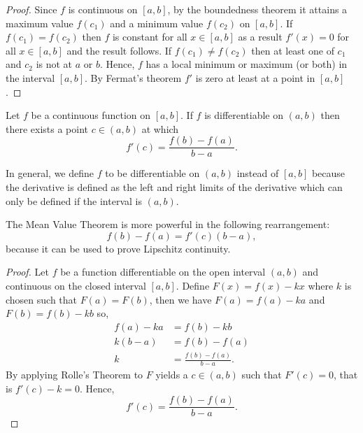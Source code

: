 \documentclass[12pt, a4paper]{article}
\begin{document}
\begin{proof}
    Since \(f\) is continuous on \([a,b]\), by the boundedness theorem it attains a maximum value \(f(c_1)\) and a minimum value \(f(c_2)\) on \([a,b]\). If \(f(c_1)=f(c_2)\) then \(f\) is constant for all \(x\in [a,b]\) as a result \(f'(x)=0\) for all \(x \in [a,b]\) and the result follows. If \(f(c_1) \neq f(c_2)\) then at least one of \(c_1\) and \(c_2\) is not at \(a\) or \(b\). Hence, \(f\) has a local minimum or maximum (or both) in the interval \([a,b]\). By Fermat's theorem \(f'\) is zero at least at a point in \([a,b]\).
\end{proof}

\begin{mdthm}
    Let \(f\) be a continuous function on \([a,b]\). If \(f\) is differentiable on \((a,b)\) then there exists a point \(c\in (a,b)\) at which 
    \[f'(c) = \frac{f(b)-f(a)}{b-a}.\]
\end{mdthm}

\begin{mdnote}
    In general, we define \(f\) to be differentiable on \((a,b)\) instead of \([a,b]\) because the derivative is defined as the left and right limits of the derivative which can only be defined if the interval is \((a,b)\).
\end{mdnote}

\begin{mdnote}
    The Mean Value Theorem is more powerful in the following rearrangement:
    \[f(b)-f(a)=f'(c)(b-a),\]
    because it can be used to prove Lipschitz continuity.
\end{mdnote}

\begin{proof}
    Let \(f\) be a function differentiable on the open interval \((a, b)\) and continuous on the closed interval \([a, b]\). Define \(F (x) = f (x) - kx\) where \(k\) is chosen such that \(F (a) = F (b)\), then we have \(F(a)=f(a)-ka\) and \(F(b)=f(b)-kb\) so,
    \[\begin{aligned}
        f(a)-ka&=f(b)-kb \\
        k (b-a) &= f(b)-f(a) \\
        k&=\frac{f(b)-f(a)}{b-a}.
    \end{aligned}\]
    By applying Rolle's Theorem to \(F\) yields a \(c \in (a,b)\) such that \(F'(c)=0\), that is \(f'(c)-k=0\). Hence,
    \[f'(c) = \frac{f(b)-f(a)}{b-a}.\]
\end{proof}
\end{document}
